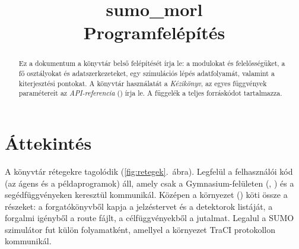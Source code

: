 \documentclass[11pt,a4paper]{article}
\title{\textbf{sumo\_morl}\\[6pt]\Large Programfelépítés}
\date{}
\begin{document}
\maketitle
\thispagestyle{empty}

\begin{abstract}
\noindent Ez a dokumentum a  könyvtár belső felépítését írja le: a modulokat és
felelősségüket, a fő osztályokat és adatszerkezeteket, egy szimulációs lépés adatfolyamát, valamint a
kiterjesztési pontokat. A könyvtár használatát a \emph{Kézikönyv}, az egyes függvények paramétereit
az \emph{API-referencia} () írja le. A függelék a teljes forráskódot
tartalmazza.
\end{abstract}

\tableofcontents
\newpage

\section{Áttekintés}

A könyvtár rétegekre tagolódik (\ref{fig:retegek}.~ábra). Legfelül a felhasználói kód (az ágens és a
példaprogramok) áll, amely csak a Gymnasium-felületen (, ) és a segédfüggvényeken
keresztül kommunikál. Középen a környezet () köti össze a részeket: a forgatókönyvből
kapja a jelzéstervet és a detektorok listáját, a forgalmi igényből a route fájlt, a célfüggvényekből a
jutalmat. Legalul a SUMO szimulátor fut külön folyamatként, amellyel a környezet TraCI protokollon
kommunikál.
\end{document}
